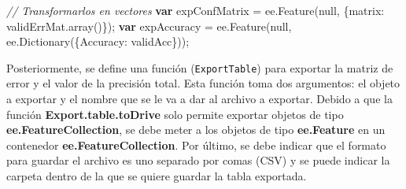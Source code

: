 \documentclass[
  12pt,
  letterpaper,
  twoside]{book}
\newenvironment{Shaded}{\begin{snugshade}}{\end{snugshade}}
\newcommand{\CommentTok}[1]{\textcolor[rgb]{0.24,0.58,0.00}{\textit{#1}}}
\newcommand{\ControlFlowTok}[1]{\textcolor[rgb]{0.00,0.00,0.00}{\textbf{#1}}}
\newcommand{\DataTypeTok}[1]{\textcolor[rgb]{0.00,0.00,0.00}{#1}}
\newcommand{\FunctionTok}[1]{\textcolor[rgb]{0.48,0.12,0.64}{#1}}
\newcommand{\KeywordTok}[1]{\textcolor[rgb]{0.48,0.12,0.64}{#1}}
\newcommand{\NormalTok}[1]{#1}
\newcommand{\OperatorTok}[1]{\textcolor[rgb]{0.00,0.00,0.00}{#1}}
\newcommand\boldpurple[1]{\textcolor{darkpurple}{\textbf{#1}}}
\begin{document}
\begin{Shaded}
\begin{Highlighting}[]
\CommentTok{// Transformarlos en vectores}
\ControlFlowTok{var}\NormalTok{ expConfMatrix }\OperatorTok{=}  \KeywordTok{ee}\OperatorTok{.}\FunctionTok{Feature}\NormalTok{(}\KeywordTok{null}\OperatorTok{,}\NormalTok{ \{}\DataTypeTok{matrix}\OperatorTok{:}\NormalTok{ validErrMat}\OperatorTok{.}\FunctionTok{array}\NormalTok{()\})}\OperatorTok{;}
\ControlFlowTok{var}\NormalTok{ expAccuracy }\OperatorTok{=} \KeywordTok{ee}\OperatorTok{.}\FunctionTok{Feature}\NormalTok{(}\KeywordTok{null}\OperatorTok{,} \KeywordTok{ee}\OperatorTok{.}\FunctionTok{Dictionary}\NormalTok{(\{}\DataTypeTok{Accuracy}\OperatorTok{:}\NormalTok{ validAcc\}))}\OperatorTok{;}
\end{Highlighting}
\end{Shaded}

Posteriormente, se define una función (\texttt{ExportTable}) para exportar la matriz de error y el valor de la precisión total. Esta función toma dos argumentos: el objeto a exportar y el nombre que se le va a dar al archivo a exportar. Debido a que la función \boldpurple{Export.table.toDrive} solo permite exportar objetos de tipo \boldpurple{ee.FeatureCollection}, se debe meter a los objetos de tipo \boldpurple{ee.Feature} en un contenedor \boldpurple{ee.FeatureCollection}. Por último, se debe indicar que el formato para guardar el archivo es uno separado por comas (CSV) y se puede indicar la carpeta dentro de la que se quiere guardar la tabla exportada.
\end{document}
